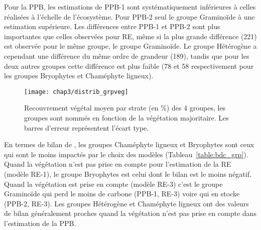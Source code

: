 Pour la PPB, les estimations de PPB-1 sont systématiquement inférieures à celles réalisées à l'échelle de l'écosystème.
Pour PPB-2 seul le groupe Graminoïde à une estimation supérieure.
Les différences entre PPB-1 et PPB-2 sont plus importantes que celles observées pour RE, même si la plus grande différence (\num{221}) est observée pour le même groupe, le groupe Graminoïde.
Le groupe Hétérogène a cependant une différence du même ordre de grandeur (\num{189}), tandis que pour les deux autres groupes cette différence est plus faible (78 et 58 respectivement pour les groupes Bryophytes et Chaméphyte ligneux).

\begin{figure}
\centering
\texttt{[image: chap3/distrib\_grpveg]}
\caption{Recouvrement végétal moyen par strate (en \si{\percent}) des 4 groupes, les groupes sont nommés en fonction de la végétation majoritaire. Les barres d'erreur représentent l'écart type.}
\label{fig:distrib_grpveg}
\end{figure}

En termes de bilan de \coo, les groupes Chaméphyte ligneux et Bryophytes sont ceux qui sont le moins impactés par le choix des modèles (Tableau~\ref{table:bdc_grp}).
Quand la végétation n'est pas prise en compte pour l'estimation de la RE (modèle RE-1), le groupe Bryophytes est celui dont le bilan est le moins négatif.
Quand la végétation est prise en compte (modèle RE-3) c'est le groupe Graminoïde qui perd le moins de carbone (PPB-1, RE-3) voire qui en stocke (PPB-2, RE-3).
Les groupes Hétérogène et Chaméphyte ligneux ont des valeurs de bilan généralement proches quand la végétation n'est pas prise en compte dans l'estimation de la PPB.




